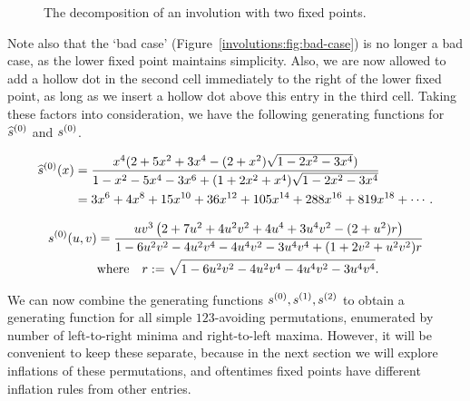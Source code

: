 \begin{figure}[t]
    
    \caption{The decomposition of an involution with two fixed points.} 
    \label{involutions:fig:twofix}
    \end{figure}

    Note also that the `bad case' (Figure~\ref{involutions:fig:bad-case}) is no
    longer a bad case, as the lower fixed point maintains simplicity. Also, we
    are now allowed to add a hollow dot in the second cell immediately to the
    right of the lower fixed point, as long as we insert a hollow dot above
    this entry in the third cell. Taking these factors into consideration, we
    have the following generating functions for $\widehat{s}^{(0)}$ and $s^{(0)}$. 

  \begin{equation} \label{involutions:eqn:htstwo}
    \begin{split}
    \widehat{s}^{(0)}(x)
    &=
    \frac{x^4(2+5x^2+3x^4-(2+x^2)\sqrt{1-2x^2-3x^4})}
    {1-x^2-5x^4-3x^6+(1+2x^2+x^4)\sqrt{1-2x^2-3x^4}}\\
    &=
    3x^6+4x^8+15x^{10}+36x^{12}+105x^{14}+288x^{16}+819x^{18}+\cdots.
    \end{split}
  \end{equation}

  \begin{equation} \label{involutions:eqn:stwo}
    \begin{split}
    s^{(0)}(u,v)
    &= \frac{uv^3\left({2+7u^2+4u^2v^2+4u^4+3u^4v^2-(2+u^2)r}\right)}
    {1-6u^2v^2-4u^2v^4-4u^4v^2-3u^4v^4+(1+2v^2+u^2v^2)r} \\
    &\text{where} \quad r := \sqrt{1-6u^2v^2-4u^2v^4-4u^4v^2-3u^4v^4}.
    \end{split}
  \end{equation}
    

  We can now combine the generating functions $s^{(0)}, s^{(1)}, s^{(2)}$ to obtain
  a generating function for all simple $123$-avoiding permutations, enumerated
  by number of left-to-right minima and right-to-left maxima. However, it will
  be convenient to keep these separate, because in the next section we will
  explore inflations of these permutations, and oftentimes fixed points have
  different inflation rules from other entries. 
       
